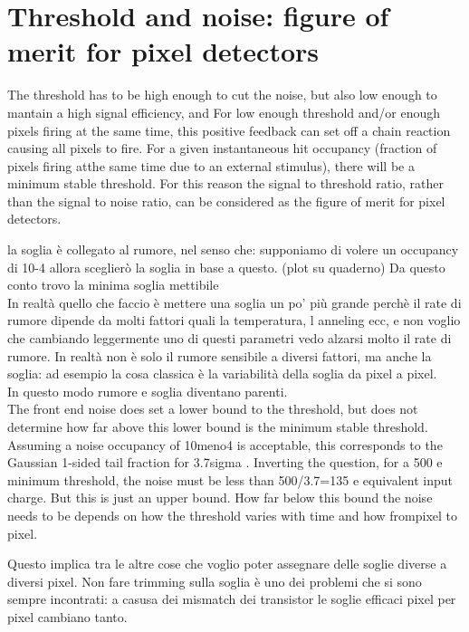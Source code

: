\section{Threshold and noise: figure of merit for pixel detectors}

The threshold has to be high enough to cut the noise, but also low enough to mantain a high signal efficiency, and 
For low enough threshold and/or enough pixels firing at the same time, this positive feedback can set off a chain reaction causing all pixels to fire. For a given instantaneous hit occupancy (fraction of pixels firing atthe same time due to an external stimulus), there will be a minimum stable threshold.
For this reason the signal to threshold ratio, rather than the signal to noise ratio, can be considered as the figure of merit for pixel detectors.


la soglia è collegato al rumore, nel senso che: supponiamo di volere un occupancy di 10-4
allora sceglierò la soglia in base a questo. (plot su quaderno)
Da questo conto trovo la minima soglia mettibile\\
In realtà quello che faccio è mettere una soglia un po' più grande perchè il rate di rumore
dipende da molti fattori quali la temperatura, l anneling ecc, e non voglio che cambiando leggermente
uno di questi parametri vedo alzarsi molto il rate di rumore. In realtà non è solo il
rumore sensibile a diversi fattori, ma anche la soglia: ad esempio la cosa classica è
la variabilità della soglia da pixel a pixel.\\
In questo modo rumore e soglia diventano parenti.\\

The front end noise does set a lower bound to the threshold, but does not determine how far above this lower bound is the minimum stable threshold. Assuming a noise occupancy of 10meno4 is acceptable, this corresponds to the Gaussian 1-sided tail fraction for 3.7sigma . Inverting the question, for a 500 e minimum threshold, the noise must be less than 500/3.7=135 e equivalent input charge. But this is just an upper bound. How far below this bound the noise needs to be depends on how the threshold varies with time and how frompixel to pixel.

Questo implica tra le altre cose che voglio poter assegnare delle soglie diverse
a diversi pixel. Non fare trimming sulla soglia è uno dei problemi che si sono sempre incontrati: a casusa dei mismatch dei transistor
le soglie efficaci pixel per pixel cambiano tanto.


